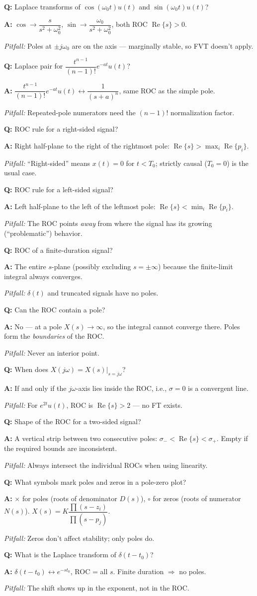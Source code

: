\documentclass[11pt]{article}
\newcommand{\Q}[1]{\par\medskip\noindent\textbf{Q:} #1}
\newcommand{\A}[1]{\par\noindent\textbf{A:} #1}
\newcommand{\Pit}[1]{\par\noindent\textit{Pitfall:} #1}
\begin{document}
\Q{Laplace transforms of $\cos(\omega_0 t)u(t)$ and $\sin(\omega_0 t)u(t)$?}
\A{$\cos\to\dfrac{s}{s^2+\omega_0^2}$, $\sin\to\dfrac{\omega_0}{s^2+\omega_0^2}$, both ROC $\operatorname{Re}\{s\}>0$.}
\Pit{Poles at $\pm j\omega_0$ are on the axis --- marginally stable, so FVT doesn't apply.}

\Q{Laplace pair for $\dfrac{t^{n-1}}{(n-1)!}e^{-at}u(t)$?}
\A{$\dfrac{t^{n-1}}{(n-1)!}e^{-at}u(t) \leftrightarrow \dfrac{1}{(s+a)^n}$, same ROC as the simple pole.}
\Pit{Repeated-pole numerators need the $(n-1)!$ normalization factor.}

\Q{ROC rule for a right-sided signal?}
\A{Right half-plane to the right of the rightmost pole: $\operatorname{Re}\{s\} > \max_i \operatorname{Re}\{p_i\}$.}
\Pit{``Right-sided'' means $x(t)=0$ for $t<T_0$; strictly causal ($T_0=0$) is the usual case.}

\Q{ROC rule for a left-sided signal?}
\A{Left half-plane to the left of the leftmost pole: $\operatorname{Re}\{s\} < \min_i \operatorname{Re}\{p_i\}$.}
\Pit{The ROC points \emph{away} from where the signal has its growing (``problematic'') behavior.}

\Q{ROC of a finite-duration signal?}
\A{The entire $s$-plane (possibly excluding $s=\pm\infty$) because the finite-limit integral always converges.}
\Pit{$\delta(t)$ and truncated signals have no poles.}

\Q{Can the ROC contain a pole?}
\A{No --- at a pole $X(s)\to\infty$, so the integral cannot converge there. Poles form the \emph{boundaries} of the ROC.}
\Pit{Never an interior point.}

\Q{When does $X(j\omega) = X(s)\big|_{s=j\omega}$?}
\A{If and only if the $j\omega$-axis lies inside the ROC, i.e., $\sigma = 0$ is a convergent line.}
\Pit{For $e^{2t}u(t)$, ROC is $\operatorname{Re}\{s\}>2$ --- no FT exists.}

\Q{Shape of the ROC for a two-sided signal?}
\A{A vertical strip between two consecutive poles: $\sigma_- < \operatorname{Re}\{s\} < \sigma_+$. Empty if the required bounds are inconsistent.}
\Pit{Always intersect the individual ROCs when using linearity.}

\Q{What symbols mark poles and zeros in a pole-zero plot?}
\A{$\times$ for poles (roots of denominator $D(s)$), $\circ$ for zeros (roots of numerator $N(s)$). $X(s) = K\dfrac{\prod(s-z_i)}{\prod(s-p_j)}$.}
\Pit{Zeros don't affect stability; only poles do.}

\Q{What is the Laplace transform of $\delta(t-t_0)$?}
\A{$\delta(t-t_0) \leftrightarrow e^{-st_0}$, ROC = all $s$. Finite duration $\Rightarrow$ no poles.}
\Pit{The shift shows up in the exponent, not in the ROC.}
\end{document}
